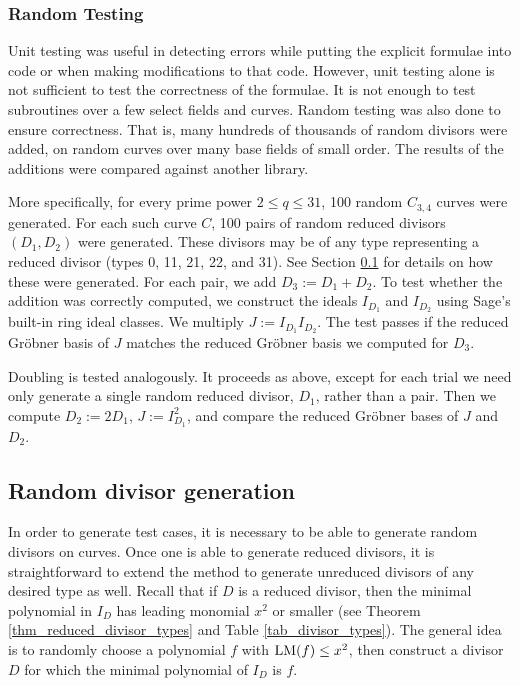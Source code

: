 \subsubsection{Random Testing}

Unit testing was useful in detecting errors while putting the explicit formulae into code
or when making modifications to that code.
However, unit testing alone is not sufficient to test the correctness of the formulae.
It is not enough to test subroutines over a few select fields and curves.
Random testing was also done to ensure correctness.
That is, many hundreds of thousands of random divisors were added,
on random curves over many base fields of small order.
The results of the additions were compared against another library.

More specifically, for every prime power $2 \leq q \leq 31$,
100 random $C_{3,4}$ curves were generated.
For each such curve $C$, 100 pairs of random reduced divisors $(D_1, D_2)$ were generated.
These divisors may be of any type representing a reduced divisor (types 0, 11, 21, 22, and 31).
See Section \ref{sec_random_divisors} for details on how these were generated.
For each pair, we add $D_3 := D_1 + D_2$.
To test whether the addition was correctly computed,
we construct the ideals $I_{D_1}$ and $I_{D_2}$ using Sage's built-in ring ideal classes.
We multiply $J := I_{D_1} I_{D_2}$.
The test passes if the reduced Gr\"obner basis of $J$
matches the reduced Gr\"obner basis we computed for $D_3$.

Doubling is tested analogously.
It proceeds as above,
except for each trial we need only generate a single random reduced divisor, $D_1$,
rather than a pair.
Then we compute $D_2 := 2D_1$, $J := I_{D_1}^2$,
and compare the reduced Gr\"obner bases of $J$ and $D_2$.




\subsection{Random divisor generation}
\label{sec_random_divisors}

In order to generate test cases, it is necessary to be able to generate random divisors on curves.
Once one is able to generate reduced divisors,
it is straightforward to extend the method to generate unreduced divisors of any desired type as well.
Recall that if $D$ is a reduced divisor,
then the minimal polynomial in $I_D$ has leading monomial $x^2$ or smaller
(see Theorem \ref{thm_reduced_divisor_types} and Table \ref{tab_divisor_types}).
The general idea is to randomly choose a polynomial $f$ with $\operatorname{LM}(f) \leq x^2$,
then construct a divisor $D$ for which the minimal polynomial of $I_D$ is $f$.

